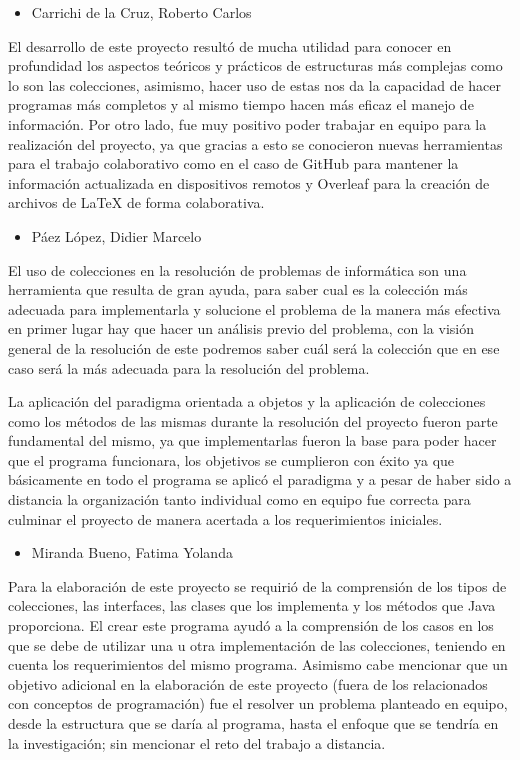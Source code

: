 \documentclass[12pt]{report}
\begin{document}
\begin{itemize}
    \item Carrichi de la Cruz, Roberto Carlos
\end{itemize}
El desarrollo de este proyecto resultó de mucha utilidad para conocer en profundidad los aspectos teóricos y prácticos de estructuras más complejas como lo son las colecciones, asimismo, hacer uso de estas nos da la capacidad de hacer programas más completos y al mismo tiempo hacen más eficaz el manejo de información. Por otro lado, fue muy positivo poder trabajar en equipo para la realización del proyecto, ya que gracias a esto se conocieron nuevas herramientas para el trabajo colaborativo como en el caso de GitHub para mantener la información actualizada en dispositivos remotos y Overleaf para la creación de archivos de LaTeX de forma colaborativa.

\begin{itemize}
    \item Páez López, Didier Marcelo
\end{itemize}    
El uso de colecciones en la resolución de problemas de informática son una herramienta que resulta de gran ayuda, para saber cual es la colección más adecuada para implementarla y solucione el problema de la manera más efectiva en primer lugar hay que hacer un análisis previo del problema, con la visión general de la resolución de este podremos saber cuál será la colección que en ese caso será la más adecuada para la resolución del problema.

La aplicación del paradigma orientada a objetos y la aplicación de colecciones como los métodos de las mismas durante la resolución del proyecto fueron parte fundamental del mismo, ya que implementarlas fueron la base para poder hacer que el programa funcionara, los objetivos se cumplieron con éxito ya que básicamente en todo el programa se aplicó el paradigma y a pesar de haber sido a distancia la organización tanto individual como en equipo fue correcta para culminar el proyecto de manera acertada a los requerimientos iniciales.

\begin{itemize}
    \item Miranda Bueno, Fatima Yolanda
\end{itemize}
Para la elaboración de este proyecto se requirió de la comprensión de los tipos de colecciones, las interfaces, las clases que los implementa y los métodos que Java proporciona. El crear este programa ayudó  a la comprensión de los casos en los que se debe de utilizar una u otra implementación de las colecciones, teniendo en cuenta los requerimientos del mismo programa. Asimismo cabe mencionar que un objetivo adicional en la elaboración de este proyecto (fuera de los relacionados con conceptos de programación) fue el resolver un problema planteado en equipo, desde la estructura que se daría al programa, hasta el enfoque que se tendría en la investigación; sin mencionar el reto del trabajo a distancia.
\end{document}

